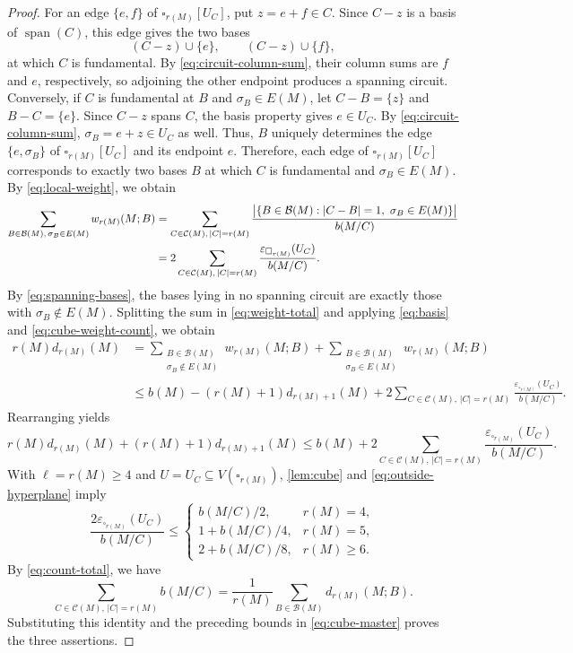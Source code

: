 \documentclass[11pt]{article}
\numberwithin{equation}{section}
\DeclareMathOperator{\spanof}{span}
\newcommand{\BB}{\mathcal B}
\newcommand{\CC}{\mathcal C}
\newcommand{\wloc}[1]{w_{#1}(M;B)}
\newcommand{\dloc}[1]{d_{#1}(M;B)}
\begin{document}
\begin{proof}
For an edge \(\{e,f\}\) of \(\square_{r(M)}[U_C]\), put
\(z=e+f\in C\). Since \(C-z\) is a basis of \(\spanof(C)\), this edge gives the two bases
\[
 (C-z)\cup\{e\},\qquad (C-z)\cup\{f\},
\]
at which \(C\) is fundamental. By \eqref{eq:circuit-column-sum},
their column sums are \(f\) and \(e\), respectively, so adjoining
the other endpoint produces a spanning circuit.
Conversely, if \(C\) is fundamental at
\(B\) and \(\sigma_B\in E(M)\), let
\(C-B=\{z\}\) and \(B-C=\{e\}\).
Since \(C-z\) spans \(C\), the basis property gives \(e\in U_C\).
By \eqref{eq:circuit-column-sum}, \(\sigma_B=e+z\in U_C\) as well.
Thus, \(B\) uniquely determines the edge \(\{e,\sigma_B\}\) of
\(\square_{r(M)}[U_C]\) and its endpoint \(e\).
Therefore, each edge of \(\square_{r(M)}[U_C]\) corresponds to exactly
two bases \(B\) at which \(C\) is fundamental and \(\sigma_B\in E(M)\).
By \eqref{eq:local-weight}, we obtain
\begin{align}
 \sum_{B\in\BB(M),\,\sigma_B\in E(M)}\wloc{r(M)}&=\sum_{C\in\CC(M),\,|C|=r(M)}
 \frac{\bigl|\{B\in\BB(M):|C-B|=1,\ \sigma_B\in E(M)\}\bigr|}{b(M/C)}\notag\\
 &=2\sum_{C\in\CC(M),\,|C|=r(M)}
 \frac{\varepsilon_{\square_{r(M)}}(U_C)}{b(M/C)}.
 \label{eq:cube-weight-count}
\end{align}
By \eqref{eq:spanning-bases}, the bases lying in no spanning circuit
are exactly those with \(\sigma_B\notin E(M)\).
Splitting the sum in \eqref{eq:weight-total} and applying
\eqref{eq:basis} and \eqref{eq:cube-weight-count}, we obtain
\begin{align*}
 r(M)d_{r(M)}(M)
 &=\sum_{\substack{B\in\BB(M)\\\sigma_B\notin E(M)}}\wloc{r(M)}
 +\sum_{\substack{B\in\BB(M)\\\sigma_B\in E(M)}}\wloc{r(M)}\\
 &\le b(M)-(r(M)+1)d_{r(M)+1}(M)+2\sum_{C\in\CC(M),\,|C|=r(M)}
 \frac{\varepsilon_{\square_{r(M)}}(U_C)}{b(M/C)}.
\end{align*}
Rearranging yields
\begin{equation}\label{eq:cube-master}
 r(M)d_{r(M)}(M)+(r(M)+1)d_{r(M)+1}(M)
 \le b(M)+2\sum_{C\in\CC(M),\,|C|=r(M)}
 \frac{\varepsilon_{\square_{r(M)}}(U_C)}{b(M/C)}.
\end{equation}
With \(\ell=r(M)\ge4\) and \(U=U_C\subseteq V(\square_{r(M)})\),
\autoref{lem:cube} and \eqref{eq:outside-hyperplane} imply
\[
 \frac{2\varepsilon_{\square_{r(M)}}(U_C)}{b(M/C)}
 \le\begin{cases}
 b(M/C)/2,&r(M)=4,\\
 1+b(M/C)/4,&r(M)=5,\\
 2+b(M/C)/8,&r(M)\ge6.
 \end{cases}
\]
By \eqref{eq:count-total}, we have
\[
 \sum_{C\in\CC(M),\,|C|=r(M)}b(M/C)
 =\frac1{r(M)}\sum_{B\in\BB(M)}\dloc{r(M)}.
\]
Substituting this identity and the preceding bounds in
\eqref{eq:cube-master} proves the three assertions.
\end{proof}
\end{document}
